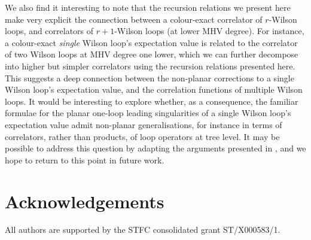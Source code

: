 \documentclass[12pt]{article}
\numberwithin{equation}{section}
\begin{document}
We also find it interesting to note that the recursion relations we present here make very explicit the connection between a colour-exact correlator of \(r\)-Wilson loops, and correlators of \(r+1\)-Wilson loops (at lower MHV degree). For instance, a colour-exact \emph{single} Wilson loop's expectation value is related to the correlator of two Wilson loops at MHV degree one lower, which we can further decompose into higher but simpler correlators using the recursion relations presented here. This suggests a deep connection between the non-planar corrections to a single Wilson loop's expectation value, and the correlation functions of multiple Wilson loops. It would be interesting to explore whether, as a consequence, the familiar formulae for the planar one-loop leading singularities of a single Wilson loop's expectation value admit non-planar generalisations, for instance in terms of correlators, rather than products, of loop operators at tree level. It may be possible to address this question by adapting the arguments presented in \cite{Drummond:2026gpt}, and we hope to return to this point in future work.

\section*{Acknowledgements}

All authors are supported by the STFC consolidated grant ST/X000583/1.


\appendix

\newpage
\end{document}
